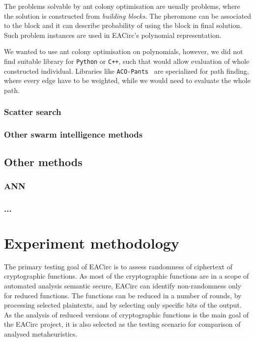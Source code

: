 \documentclass[
  print, %
  Table,   %
  nolof,     %
  nolot,     %
  11pt, %
  oneside  %
]{fithesis3}
\begin{document}
The problems solvable by ant colony optimisation are usually problems, where the solution is constructed from \textit{building blocks}. The pheromone can be associated to the block and it can describe probability of using the block in final solution. Such problem instances are used in EACirc's polynomial representation.

We wanted to use ant colony optimisation on polynomials, however, we did not find suitable library for \texttt{Python} or \texttt{C++}, such that would allow evaluation of whole constructed individual. Libraries like \texttt{ACO-Pants}~\cite{acoPants} are specialized for path finding, where every edge have to be weighted, while we would need to evaluate the whole path.

\subsection{Scatter search}
\label{subsec:opt-multi-sol-scatter}
\subsection{Other swarm intelligence methods}
\label{subsec:opt-multi-sol-si}
\section{Other methods}
\label{sec:opt-other}
\subsection{ANN}
\label{subsec:opt-other-ann}
\subsection{...}



\chapter{Experiment methodology}
\label{chap:method}

The primary testing goal of EACirc is to assess randomness of ciphertext of cryptographic functions. As most of the cryptographic functions are in a scope of automated analysis semantic secure, EACirc can identify non-randomness only for reduced functions. The functions can be reduced in a number of rounds, by processing selected plaintexts, and by selecting only specific bits of the output. As the analysis of reduced versions of cryptographic functions is the main goal of the EACirc project, it is also selected as the testing scenario for comparison of analysed metaheuristics.
\end{document}
